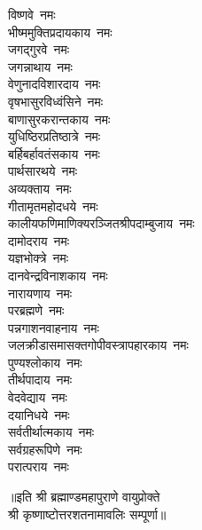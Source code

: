 \begin{multicols}{2}
\begin{flushleft}
विष्णवे~नमः\\
भीष्ममुक्तिप्रदायकाय~नमः\\
जगद्गुरवे~नमः\\
जगन्नाथाय~नमः\\
वेणुनादविशारदाय~नमः\\
वृषभासुरविध्वंसिने~नमः\\
बाणासुरकरान्तकाय~नमः\\
युधिष्ठिरप्रतिष्ठात्रे~नमः\\
बर्हिबर्हावतंसकाय~नमः\hfill{}\\
पार्थसारथये~नमः\\
अव्यक्ताय~नमः\\
गीतामृतमहोदधये~नमः\\
कालीयफणिमाणिक्य\-रञ्जित\-श्री\-पदाम्बुजाय~नमः\\
दामोदराय~नमः\\
यज्ञभोक्त्रे~नमः\\
दानवेन्द्रविनाशकाय~नमः\\
नारायणाय~नमः\\
परब्रह्मणे~नमः\\
पन्नगाशनवाहनाय~नमः\hfill{}\\
जलक्रीडासमासक्त\-गोपी\-वस्त्रापहारकाय~नमः\\
पुण्यश्लोकाय~नमः\\
तीर्थपादाय~नमः\\
वेदवेद्याय~नमः\\
दयानिधये~नमः\\
सर्वतीर्थात्मकाय~नमः\\
सर्वग्रहरूपिणे~नमः\\
परात्पराय~नमः\\
\end{flushleft}
\end{multicols}
॥इति श्री ब्रह्माण्डमहापुराणे वायुप्रोक्ते\\श्री कृष्णाष्टोत्तरशतनामावलिः सम्पूर्णा॥
